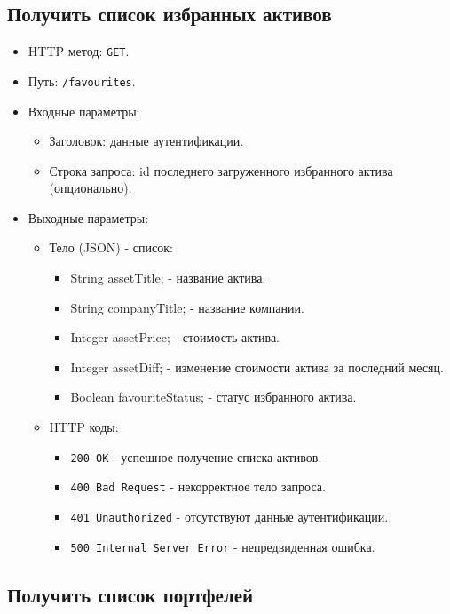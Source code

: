 \documentclass[a4paper, 14pt]{article}
\begin{document}
\subsection{Получить список избранных активов}

\begin{itemize}
    \item HTTP метод: \texttt{GET}.
    \item Путь: \texttt{/favourites}.
    \item Входные параметры:
    \begin{itemize}
        \item Заголовок: данные аутентификации.
        \item Строка запроса: id последнего загруженного избранного актива (опционально).
    \end{itemize}
    \item Выходные параметры:
    \begin{itemize}
        \item Тело (JSON) - список:
        \begin{itemize}
            \item String assetTitle; - название актива.
            \item String companyTitle; - название компании.
            \item Integer assetPrice; - стоимость актива.
            \item Integer assetDiff; - изменение стоимости актива за последний месяц.
            \item Boolean favouriteStatus; - статус избранного актива.
        \end{itemize}
        \item HTTP коды:
        \begin{itemize}
            \item \texttt{200 OK} - успешное получение списка активов.
            \item \texttt{400 Bad Request} - некорректное тело запроса.
            \item \texttt{401 Unauthorized} - отсутствуют данные аутентификации.
            \item \texttt{500 Internal Server Error} - непредвиденная ошибка.
        \end{itemize}
    \end{itemize}
\end{itemize}

\subsection{Получить список портфелей}
\end{document}
